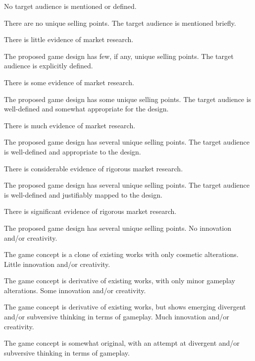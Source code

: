 \documentclass{../fal_assignment}
\begin{document}
\begin{markingrubric}
%
        \grade\fail No target audience is mentioned or defined.
            \par There are no unique selling points.
        \grade The target audience is mentioned briefly.
            \par There is little evidence of market research.
            \par The proposed game design has few, if any, unique selling points.
        \grade The target audience is explicitly defined.
            \par There is some evidence of market research.
            \par The proposed game design has some unique selling points.
        \grade The target audience is well-defined and somewhat appropriate for the design.
            \par There is much evidence of market research.
            \par The proposed game design has several unique selling points.
        \grade The target audience is well-defined and appropriate to the design.
            \par There is considerable evidence of rigorous market research.
            \par The proposed game design has several unique selling points.
        \grade The target audience is well-defined and justifiably mapped to the design.
            \par There is significant evidence of rigorous market research.
            \par The proposed game design has several unique selling points.
%
        \grade\fail No innovation and/or creativity.
            \par The game concept is a clone of existing works with only cosmetic alterations.
        \grade Little innovation and/or creativity.
            \par The game concept is derivative of existing works, with only minor gameplay alterations.
        \grade Some innovation and/or creativity.
            \par The game concept is derivative of existing works, but shows emerging divergent and/or subversive thinking in terms of gameplay.
        \grade Much innovation and/or creativity.
            \par The game concept is somewhat original, with an attempt at divergent and/or subversive thinking in terms of gameplay.

\end{markingrubric}
\end{document}
